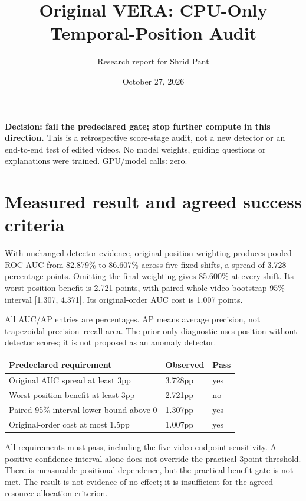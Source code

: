 \documentclass[11pt]{article}
\title{Original VERA: CPU-Only Temporal-Position Audit}
\author{Research report for Shrid Pant}\date{October 27, 2026}
\begin{document}
\maketitle
\textbf{Decision: fail the predeclared gate; stop further compute in this direction.} This is a retrospective score-stage audit, not a new detector or an end-to-end test of edited videos. No model weights, guiding questions or explanations were trained. GPU/model calls: zero.

\section{Measured result and agreed success criteria}
With unchanged detector evidence, original position weighting produces pooled ROC-AUC from 82.879\% to 86.607\% across five fixed shifts, a spread of 3.728 percentage points. Omitting the final weighting gives 85.600\% at every shift. Its worst-position benefit is 2.721 points, with paired whole-video bootstrap 95\% interval [1.307, 4.371]. Its original-order AUC cost is 1.007 points.

\begin{center}\small\end{center}
All AUC/AP entries are percentages. AP means average precision, not trapezoidal precision--recall area. The prior-only diagnostic uses position without detector scores; it is not proposed as an anomaly detector.

\begin{center}\begin{tabularx}{\linewidth}{Xll}\toprule
Predeclared requirement & Observed & Pass\\\midrule
Original AUC spread at least 3pp & 3.728pp & yes\\
Worst-position benefit at least 3pp & 2.721pp & no\\
Paired 95\% interval lower bound above 0 & 1.307pp & yes\\
Original-order cost at most 1.5pp & 1.007pp & yes\\\bottomrule
\end{tabularx}\end{center}

All requirements must pass, including the five-video endpoint sensitivity. A positive confidence interval alone does not override the practical 3point threshold. There is measurable positional dependence, but the practical-benefit gate is not met. The result is not evidence of no effect; it is insufficient for the agreed resource-allocation criterion.
\end{document}
